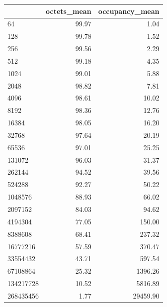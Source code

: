 \begin{tabular}{lrr}
\toprule
 & octets_mean & occupancy_mean \\
\midrule
64 & 99.97 & 1.04 \\
128 & 99.78 & 1.52 \\
256 & 99.56 & 2.29 \\
512 & 99.18 & 4.35 \\
1024 & 99.01 & 5.88 \\
2048 & 98.82 & 7.81 \\
4096 & 98.61 & 10.02 \\
8192 & 98.36 & 12.76 \\
16384 & 98.05 & 16.20 \\
32768 & 97.64 & 20.19 \\
65536 & 97.01 & 25.25 \\
131072 & 96.03 & 31.37 \\
262144 & 94.52 & 39.56 \\
524288 & 92.27 & 50.22 \\
1048576 & 88.93 & 66.02 \\
2097152 & 84.03 & 94.62 \\
4194304 & 77.05 & 150.00 \\
8388608 & 68.41 & 237.32 \\
16777216 & 57.59 & 370.47 \\
33554432 & 43.71 & 597.54 \\
67108864 & 25.32 & 1396.26 \\
134217728 & 10.52 & 5816.89 \\
268435456 & 1.77 & 29459.90 \\
\bottomrule
\end{tabular}

